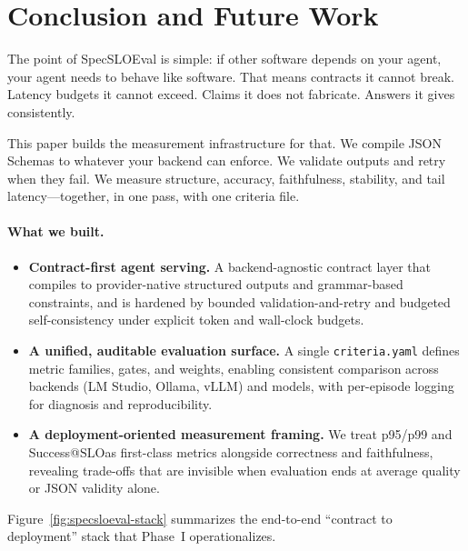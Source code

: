 \documentclass[11pt]{article}
\newcommand{\slo}{\ensuremath{\mathrm{SLO}}}
\begin{document}
\section{Conclusion and Future Work}
\label{sec:conclusion}

The point of SpecSLOEval is simple: if other software depends on your agent, your agent needs to behave like software.
That means contracts it cannot break.
Latency budgets it cannot exceed.
Claims it does not fabricate.
Answers it gives consistently.

This paper builds the measurement infrastructure for that.
We compile JSON Schemas to whatever your backend can enforce.
We validate outputs and retry when they fail.
We measure structure, accuracy, faithfulness, stability, and tail latency---together, in one pass, with one criteria file.

\paragraph{What we built.}

\begin{itemize}[leftmargin=12pt]
    \item \textbf{Contract-first agent serving.}
    A backend-agnostic contract layer that compiles to provider-native structured outputs and grammar-based constraints, and is hardened by bounded validation-and-retry and budgeted self-consistency under explicit token and wall-clock budgets.

    \item \textbf{A unified, auditable evaluation surface.}
    A single \texttt{criteria.yaml} defines metric families, gates, and weights, enabling consistent comparison across backends (LM Studio, Ollama, vLLM) and models, with per-episode logging for diagnosis and reproducibility.

    \item \textbf{A deployment-oriented measurement framing.}
    We treat p95/p99 and Success@\slo as first-class metrics alongside correctness and faithfulness, revealing trade-offs that are invisible when evaluation ends at average quality or JSON validity alone.
\end{itemize}

Figure~\ref{fig:specsloeval-stack} summarizes the end-to-end ``contract to deployment'' stack that Phase~I operationalizes.
\end{document}
